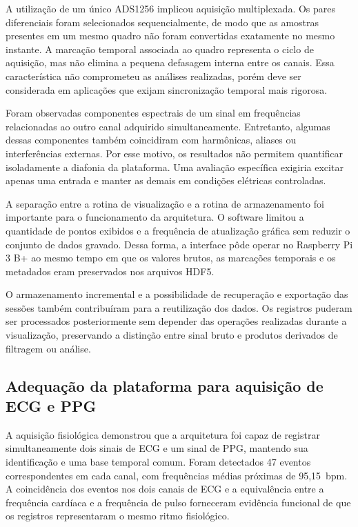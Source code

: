 \documentclass[a4paper,12pt]{fcte}
\begin{document}
A utilização de um único ADS1256 implicou aquisição multiplexada. Os pares diferenciais foram selecionados sequencialmente, de modo que as amostras presentes em um mesmo quadro não foram convertidas exatamente no mesmo instante. A marcação temporal associada ao quadro representa o ciclo de aquisição, mas não elimina a pequena defasagem interna entre os canais. Essa característica não comprometeu as análises realizadas, porém deve ser considerada em aplicações que exijam sincronização temporal mais rigorosa.

Foram observadas componentes espectrais de um sinal em frequências relacionadas ao outro canal adquirido simultaneamente. Entretanto, algumas dessas componentes também coincidiram com harmônicas, aliases ou interferências externas. Por esse motivo, os resultados não permitem quantificar isoladamente a diafonia da plataforma. Uma avaliação específica exigiria excitar apenas uma entrada e manter as demais em condições elétricas controladas.

A separação entre a rotina de visualização e a rotina de armazenamento foi importante para o funcionamento da arquitetura. O software limitou a quantidade de pontos exibidos e a frequência de atualização gráfica sem reduzir o conjunto de dados gravado. Dessa forma, a interface pôde operar no Raspberry Pi 3 B+ ao mesmo tempo em que os valores brutos, as marcações temporais e os metadados eram preservados nos arquivos HDF5.

O armazenamento incremental e a possibilidade de recuperação e exportação das sessões também contribuíram para a reutilização dos dados. Os registros puderam ser processados posteriormente sem depender das operações realizadas durante a visualização, preservando a distinção entre sinal bruto e produtos derivados de filtragem ou análise.

\subsection{Adequação da plataforma para aquisição de ECG e PPG}
\label{subsec:discussao_ecg_ppg}

A aquisição fisiológica demonstrou que a arquitetura foi capaz de registrar simultaneamente dois sinais de ECG e um sinal de PPG, mantendo sua identificação e uma base temporal comum. Foram detectados 47 eventos correspondentes em cada canal, com frequências médias próximas de 95,15~bpm. A coincidência dos eventos nos dois canais de ECG e a equivalência entre a frequência cardíaca e a frequência de pulso forneceram evidência funcional de que os registros representaram o mesmo ritmo fisiológico.
\end{document}

